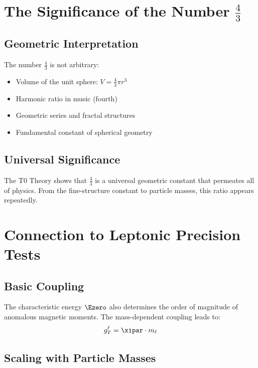 	\section{The Significance of the Number $\frac{4}{3}$}
	
	\subsection{Geometric Interpretation}
	
	The number $\frac{4}{3}$ is not arbitrary:
	\begin{itemize}
		\item Volume of the unit sphere: $V = \frac{4}{3}\pi r^3$
		\item Harmonic ratio in music (fourth)
		\item Geometric series and fractal structures
		\item Fundamental constant of spherical geometry
	\end{itemize}
	
	\subsection{Universal Significance}
	
	The T0 Theory shows that $\frac{4}{3}$ is a universal geometric constant that permeates all of physics. From the fine-structure constant to particle masses, this ratio appears repeatedly.
	
	\section{Connection to Leptonic Precision Tests}
	
	\subsection{Basic Coupling}
	
	The characteristic energy $\Ezero$ also determines the order of magnitude of anomalous magnetic moments. The mass-dependent coupling leads to:
	\begin{equation}
		g_T^\ell = \xipar \cdot m_\ell
		\label{eq:coupling_g2}
	\end{equation}
	
	\subsection{Scaling with Particle Masses}
	
